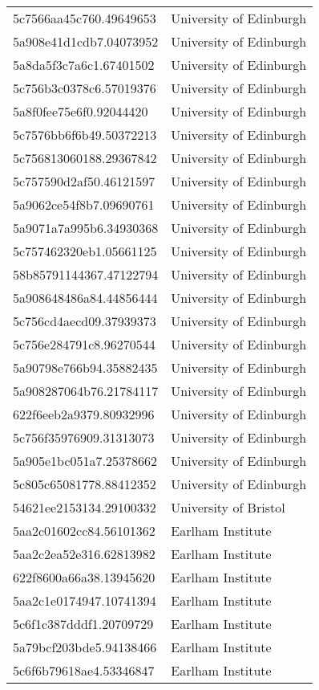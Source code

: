 \begin{tabular}{ll}
5c7566aa45c760.49649653 & University of Edinburgh \\
5a908e41d1cdb7.04073952 & University of Edinburgh \\
5a8da5f3c7a6c1.67401502 & University of Edinburgh \\
5c756b3c0378c6.57019376 & University of Edinburgh \\
5a8f0fee75e6f0.92044420 & University of Edinburgh \\
5c7576bb6f6b49.50372213 & University of Edinburgh \\
5c756813060188.29367842 & University of Edinburgh \\
5c757590d2af50.46121597 & University of Edinburgh \\
5a9062ce54f8b7.09690761 & University of Edinburgh \\
5a9071a7a995b6.34930368 & University of Edinburgh \\
5c757462320eb1.05661125 & University of Edinburgh \\
58b85791144367.47122794 & University of Edinburgh \\
5a908648486a84.44856444 & University of Edinburgh \\
5c756cd4aecd09.37939373 & University of Edinburgh \\
5c756e284791c8.96270544 & University of Edinburgh \\
5a90798e766b94.35882435 & University of Edinburgh \\
5a908287064b76.21784117 & University of Edinburgh \\
622f6eeb2a9379.80932996 & University of Edinburgh \\
5c756f35976909.31313073 & University of Edinburgh \\
5a905e1bc051a7.25378662 & University of Edinburgh \\
5c805c65081778.88412352 & University of Edinburgh \\
54621ee2153134.29100332 & University of Bristol \\
5aa2c01602cc84.56101362 & Earlham Institute \\
5aa2c2ea52e316.62813982 & Earlham Institute \\
622f8600a66a38.13945620 & Earlham Institute \\
5aa2c1e0174947.10741394 & Earlham Institute \\
5c6f1c387dddf1.20709729 & Earlham Institute \\
5a79bcf203bde5.94138466 & Earlham Institute \\
5c6f6b79618ae4.53346847 & Earlham Institute \\

\end{tabular}
